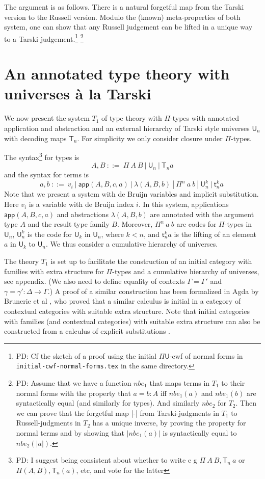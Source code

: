 \documentclass[11pt,a4paper]{article}
\theoremstyle{definition}
\def\UU{\mathsf{U}}
\newcommand{\LAM}{\lambda}
\newcommand{\APP}{\mathsf{app}}
\newcommand{\T}{\mathsf{T}}
\newcommand{\sT}{\mathsf{t}}
\begin{document}
The argument is as follows. There is a natural forgetful map from the Tarski version to the Russell version. Modulo the (known) meta-properties of both system, one can show that any Russell judgement can be lifted in a unique way to a Tarski judgement.\footnote{PD: Cf the sketch of a proof using the initial $\Pi\UU$-cwf of normal forms in {\tt initial-cwf-normal-forms.tex} in the same directory.}
\footnote{PD: Assume that we have a function $nbe_1$ that maps terms in $T_1$ to their normal forms with the property that $a = b : A$ iff $nbe_1(a)$ and $nbe_1(b)$ are syntactically equal (and similarly for types). And similarly $nbe_2$ for $T_2$. Then we can prove that the forgetful map |-| from Tarski-judgments in $T_1$ to Russell-judgments in $T_2$ has a unique inverse, by proving the property for normal terms and by showing that $|nbe_1(a)|$ is syntactically equal to $nbe_2(|a|)$. }

\section{An annotated type theory with universes \`a la Tarski}

We now present the system $T_1$ of type theory with $\Pi$-types with annotated application and abstraction and an external hierarchy of Tarski style universes $\UU_n$ with decoding maps $\T_n$. For simplicity we only consider closure under $\Pi$-types. 

The syntax\footnote{PD: 
I suggest being consistent about whether to write e g $\Pi~A~B, \T_n~a$ 
or $\Pi(A,B),\T_n(a)$, etc, and vote for the latter
} 
for types is
$$
A,B~::=~\Pi~{A}~B~|~\UU_n~|~\T_n a
$$
and the syntax for terms is
$$
a,b~::=~v_i~|~\APP(A,B,c,a)~|~\LAM(A,B,b)~|~\Pi^n~ a~b~|~\UU^k_n~|~\sT^k_n a~
$$
Note that we present a system with de Bruijn variables and implicit substitution.
Here $v_i$ is a variable with de Bruijn index $i$. In this system, applications $\APP(A,B,c,a)$ and abstractions $\LAM(A,B,b)$ are annotated with the argument type $A$ and the result type family $B$. Moreover, $\Pi^n~ a~b$ are codes for $\Pi$-types in $\UU_n$, $\UU^k_n$ is the code for $\UU_k$ in $\UU_n$, where $k < n$, and $\sT^k_n a$ is the lifting of an element $a$ in $\UU_k$ to $\UU_n$. We thus consider a cumulative hierarchy of universes.

The theory $T_1$ is set up to facilitate the construction of an initial category with families with extra structure for $\Pi$-types and a cumulative hierarchy of universes, see appendix. (We also need to define equality of contexts $\Gamma = \Gamma'$ and $\gamma = \gamma' : \Delta \to \Gamma$.) A proof of a similar construction has been formalized in Agda by Brunerie et al \cite{brunerie:initial}, who proved that a similar calculus is initial in a category of contextual categories with suitable extra structure. Note that initial categories with families (and contextual categories) with suitable extra structure can also be constructed from a calculus of explicit substitutions  \cite{casellan:tlca15}.
\end{document}
